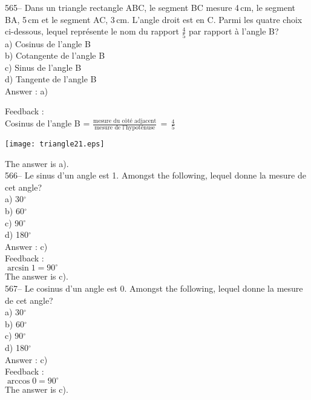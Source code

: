 ﻿\documentclass[letterpaper, 12pt]{article}
\begin{document}
565-- Dans un triangle rectangle ABC, le segment BC mesure 4\,cm, le segment
BA, 5\,cm et le segment AC, 3\,cm.  L'angle droit est en C.  Parmi les
quatre choix ci-dessous, lequel repr\'esente le nom du rapport $\frac{4}{5}$
par rapport \`a l'angle B?\\
a) Cosinus de l'angle B\\
b) Cotangente de l'angle B\\
c) Sinus de l'angle B\\
d) Tangente de l'angle B\\

Answer : a)

Feedback : \\
Cosinus de l'angle B = $\frac{\textrm{mesure du c\^ot\'e
adjacent}}{\textrm{mesure de
l'hypot\'enuse}}\,=\,\frac{\textrm{4}}{\textrm{5}}$\\
\begin{center}
    \texttt{[image: triangle21.eps]}
    \end{center}
The answer is a).\\

566-- Le sinus d'un angle est 1.  Amongst the following, lequel
donne la mesure de cet angle?\\
a) 30$^{\circ}$\\
b) 60$^{\circ}$\\
c) 90$^{\circ}$\\
d) 180$^{\circ}$\\

Answer : c)\\

Feedback : \\
$\arcsin 1 = 90^{\circ}$\\
The answer is c).\\

567-- Le cosinus d'un angle est 0.  Amongst the following, lequel
donne la mesure de cet angle?\\
a) 30$^{\circ}$\\
b) 60$^{\circ}$\\
c) 90$^{\circ}$\\
d) 180$^{\circ}$\\

Answer : c)\\

Feedback : \\
$\arccos 0 = 90^{\circ}$\\
The answer is c).\\
\end{document}
